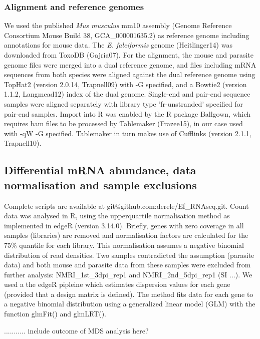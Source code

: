 \documentclass{bmcart}
\begin{document}
\subsubsection{Alignment and reference genomes}
We used the published \textit{Mus musculus} mm10 assembly (Genome Reference Consortium Mouse 
Build 38, GCA\_000001635.2) as reference genome including annotations for mouse data. The
\textit{E. falciformis} genome (Heitlinger14) was downloaded from ToxoDB (Gajria07). For the
alignment, the mouse and parasite genome files were merged into a dual reference genome, and 
files including mRNA sequences from both species were aligned against the dual reference genome
using TopHat2 (version 2.0.14, Trapnell09) with -G specified, and a Bowtie2 (version 1.1.2, Langmead12) index of the dual genome. Single-end and pair-end sequence samples were aligned separately with library type 'fr-unstranded' specified for pair-end samples. Import into R was enabled by the R package Ballgown, which requires bam files to be processed by Tablemaker (Frazee15), in our case used with -qW -G specified. Tablemaker in turn makes use of Cufflinks (version 2.1.1, Trapnell10).

\subsection{Differential mRNA abundance, data normalisation and sample exclusions}
Complete scripts are available at git@github.com:derele/Ef\_RNAseq.git. Count data was analysed in R, using the upperquartile normalisation method as implemented in edgeR (version 3.14.0). Briefly, genes with zero coverage in all samples (libraries) are removed and normalisation factors are calculated for the 75\% quantile for each library. This  normalisation assumes a negative binomial distribution of read densities. Two samples contradicted the assumption (parasite data) and both mouse and parasite data from these samples were excluded from further analysis: NMRI\_1st\_3dpi\_rep1 and NMRI\_2nd\_5dpi\_rep1 (SI ...). We used a the edgeR pipleine which estimates dispersion values for each gene (provided that a design matrix is defined). The method fits data for each gene to a negative binomial distribution using a generalized linear model (GLM) with the function glmFit() and glmLRT(). 

........... include outcome of MDS analysis here?
\end{document}
